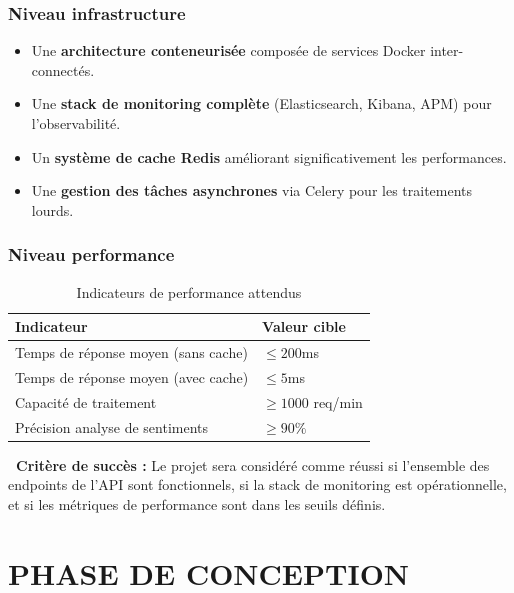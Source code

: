 \documentclass[11pt,a4paper]{report}
\begin{document}
\subsection*{Niveau infrastructure}

\begin{itemize}
    \item Une \textbf{architecture conteneurisée} composée de services Docker inter-connectés.
    \item Une \textbf{stack de monitoring complète} (Elasticsearch, Kibana, APM) pour l'observabilité.
    \item Un \textbf{système de cache Redis} améliorant significativement les performances.
    \item Une \textbf{gestion des tâches asynchrones} via Celery pour les traitements lourds.
\end{itemize}

\subsection*{Niveau performance}

\begin{table}[H]
\centering
\caption{Indicateurs de performance attendus}
\label{tab:kpi}
\begin{tabular}{>{\raggedright}p{5cm} >{\centering\arraybackslash}p{4cm}}
\toprule
\textbf{Indicateur} & \textbf{Valeur cible} \\
\midrule
\rowcolor{arasLight}
Temps de réponse moyen (sans cache) & $\leq 200$ms \\
Temps de réponse moyen (avec cache) & $\leq 5$ms \\
\rowcolor{arasLight}
Capacité de traitement & $\geq 1000$ req/min \\
\rowcolor{arasLight}
Précision analyse de sentiments & $\geq 90\%$ \\

\bottomrule
\end{tabular}
\end{table}

\begin{processbox}
    \textbf{\textcolor{arasPrimary}{\faChartLine\ Critère de succès :}} Le projet sera considéré comme réussi si l'ensemble des endpoints de l'API sont fonctionnels, si la stack de monitoring est opérationnelle, et si les métriques de performance sont dans les seuils définis.
\end{processbox}

\chapter{PHASE DE CONCEPTION}
\end{document}
